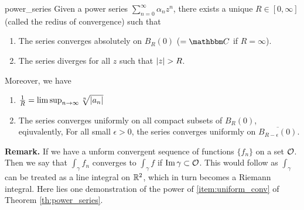 \documentclass[../ComplexAnalysis_Notes.tex]{subfiles}
\begin{document}
\begin{Thm}{}{power_series}
  Given a power series \( \sum_{n = 0}^{\infty} \alpha_n z^n \), there exists a unique \(R \in [0, \infty]\) (called the redius of convergence) such that
  \begin{enumerate}[label = (\roman*)]
    \item The series converges absolutely on \(B_R(0)\) (\(= \C\) if \(R = \infty\)). \label{item:abs_conv}
    \item The series diverges for all \(z\) such that \(\abs{z} > R\). \label{item:divergence}
  \end{enumerate}
  Moreover, we have
  \begin{enumerate}[label = (\Roman*)]
    \item \(\frac{1}{R} = \limsup_{n \to \infty} \sqrt[n]{\abs{a_n}}\)
    \item The series converges uniformly on all compact subsets of \(B_R(0)\), eqiuvalently, For all small \(\epsilon > 0\), the series converges uniformly on \(\overline{B_{R - \epsilon}(0)}\). \label{item:uniform_conv}
  \end{enumerate}
\end{Thm}

\textbf{Remark.} If we have a unform convergent sequence of functions \(\{f_n\}\) on a set \(\mathcal{O}\). Then we say that \(\int_\gamma f_n\) converges to \(\int_\gamma f\) if \(\Im \gamma \subset \mathcal{O}\). This would follow as \(\int_\gamma\) can be treated as a line integral on \(\mathbb{R}^2\), which in turn becomes a Riemann integral. Here lies one demonstration of the power of \ref{item:uniform_conv} of Theorem \ref{th:power_series}.
\end{document}
